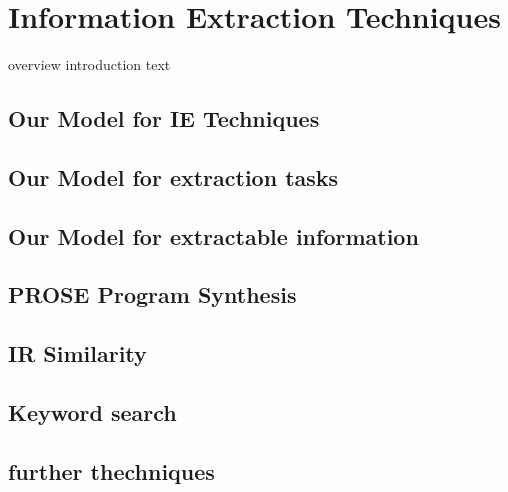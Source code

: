 \documentclass[\myrootdir/main.tex]{subfiles}
\begin{document}
\chapter{Information Extraction Techniques}
overview introduction text
\label{models}

\section{Our Model for IE Techniques}
\section{Our Model for extraction tasks}
\section{Our Model for extractable information}


\section{PROSE Program Synthesis}

\section{IR Similarity}

\section{Keyword search}

\section{further thechniques}
\end{document}
